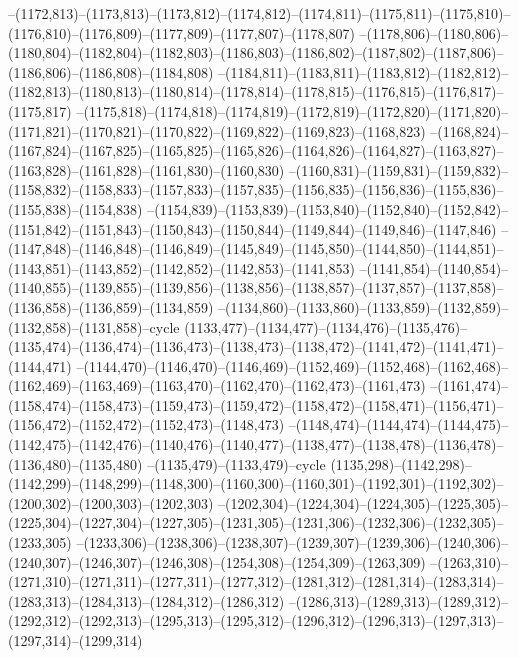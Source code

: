 --(1172,813)--(1173,813)--(1173,812)--(1174,812)--(1174,811)--(1175,811)--(1175,810)--(1176,810)--(1176,809)--(1177,809)--(1177,807)--(1178,807)
--(1178,806)--(1180,806)--(1180,804)--(1182,804)--(1182,803)--(1186,803)--(1186,802)--(1187,802)--(1187,806)--(1186,806)--(1186,808)--(1184,808)
--(1184,811)--(1183,811)--(1183,812)--(1182,812)--(1182,813)--(1180,813)--(1180,814)--(1178,814)--(1178,815)--(1176,815)--(1176,817)--(1175,817)
--(1175,818)--(1174,818)--(1174,819)--(1172,819)--(1172,820)--(1171,820)--(1171,821)--(1170,821)--(1170,822)--(1169,822)--(1169,823)--(1168,823)
--(1168,824)--(1167,824)--(1167,825)--(1165,825)--(1165,826)--(1164,826)--(1164,827)--(1163,827)--(1163,828)--(1161,828)--(1161,830)--(1160,830)
--(1160,831)--(1159,831)--(1159,832)--(1158,832)--(1158,833)--(1157,833)--(1157,835)--(1156,835)--(1156,836)--(1155,836)--(1155,838)--(1154,838)
--(1154,839)--(1153,839)--(1153,840)--(1152,840)--(1152,842)--(1151,842)--(1151,843)--(1150,843)--(1150,844)--(1149,844)--(1149,846)--(1147,846)
--(1147,848)--(1146,848)--(1146,849)--(1145,849)--(1145,850)--(1144,850)--(1144,851)--(1143,851)--(1143,852)--(1142,852)--(1142,853)--(1141,853)
--(1141,854)--(1140,854)--(1140,855)--(1139,855)--(1139,856)--(1138,856)--(1138,857)--(1137,857)--(1137,858)--(1136,858)--(1136,859)--(1134,859)
--(1134,860)--(1133,860)--(1133,859)--(1132,859)--(1132,858)--(1131,858)--cycle
(1133,477)--(1134,477)--(1134,476)--(1135,476)--(1135,474)--(1136,474)--(1136,473)--(1138,473)--(1138,472)--(1141,472)--(1141,471)--(1144,471)
--(1144,470)--(1146,470)--(1146,469)--(1152,469)--(1152,468)--(1162,468)--(1162,469)--(1163,469)--(1163,470)--(1162,470)--(1162,473)--(1161,473)
--(1161,474)--(1158,474)--(1158,473)--(1159,473)--(1159,472)--(1158,472)--(1158,471)--(1156,471)--(1156,472)--(1152,472)--(1152,473)--(1148,473)
--(1148,474)--(1144,474)--(1144,475)--(1142,475)--(1142,476)--(1140,476)--(1140,477)--(1138,477)--(1138,478)--(1136,478)--(1136,480)--(1135,480)
--(1135,479)--(1133,479)--cycle
(1135,298)--(1142,298)--(1142,299)--(1148,299)--(1148,300)--(1160,300)--(1160,301)--(1192,301)--(1192,302)--(1200,302)--(1200,303)--(1202,303)
--(1202,304)--(1224,304)--(1224,305)--(1225,305)--(1225,304)--(1227,304)--(1227,305)--(1231,305)--(1231,306)--(1232,306)--(1232,305)--(1233,305)
--(1233,306)--(1238,306)--(1238,307)--(1239,307)--(1239,306)--(1240,306)--(1240,307)--(1246,307)--(1246,308)--(1254,308)--(1254,309)--(1263,309)
--(1263,310)--(1271,310)--(1271,311)--(1277,311)--(1277,312)--(1281,312)--(1281,314)--(1283,314)--(1283,313)--(1284,313)--(1284,312)--(1286,312)
--(1286,313)--(1289,313)--(1289,312)--(1292,312)--(1292,313)--(1295,313)--(1295,312)--(1296,312)--(1296,313)--(1297,313)--(1297,314)--(1299,314)
